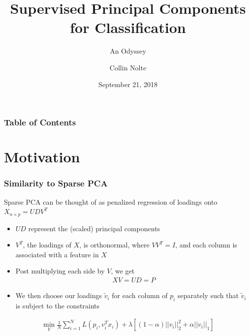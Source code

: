 \documentclass[11pt]{beamer}
\author{Collin Nolte}
\title[AMCS Seminar Talk]{Supervised Principal Components for Classification}
\subtitle{An Odyssey}
\date{September 21, 2018}
\begin{document}
\begin{frame}
\titlepage
\end{frame}

\begin{frame}
\frametitle{Table of Contents}
\tableofcontents
\end{frame}

\section{Motivation}
%
%
%


\begin{frame}
\frametitle{Similarity to Sparse PCA}
{
Sparse PCA can be thought of as penalized regression of loadings onto $X_{n \times p} = UDV^T$
\begin{itemize}
  \item $UD$ represent the (scaled) principal components
  \item $V^T$, the loadings of $X$, is orthonormal, where $VV^T = I$, and each column is associated with a feature in $X$
  \item Post multiplying each side by $V$, we get
  \begin{align*}
  XV = UD = P
  \end{align*}
  \item We then choose our loadings $\tilde{v}_i$ for each column of $p_i$ separately such that $\tilde{v}_i$ is subject to the constraints
\end{itemize}
\begin{align*}
\min_{V} \frac{1}{N} \sum_{i=1}^N L(p_i,  v_i^Tx_i) + \lambda[(1-\alpha)||v_i||_2^2 + \alpha ||v_i||_1]
\end{align*}
}
\end{frame}
\end{document}
